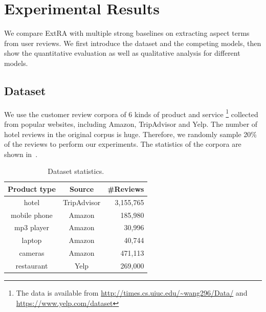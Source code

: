 \section{Experimental Results}
\label{sec:experiments}

We compare ExtRA with 
multiple strong baselines on extracting aspect terms from user reviews. 
We first introduce the dataset and the competing models, then
show the quantitative evaluation as well as qualitative analysis for
different models.

\subsection{Dataset}
\label{sec:dataset}
We use the customer review corpora of 6 kinds of product and service
\footnote{The data is available from
	\url{http://times.cs.uiuc.edu/~wang296/Data/} and 
	\url{https://www.yelp.com/dataset}} collected from popular websites, 
including Amazon, TripAdvisor and Yelp. 
The number of hotel reviews \cite{Wang2011LearningOD} in the original
corpus is huge. 
Therefore, we randomly sample 20\% of the reviews to perform our experiments.
The statistics of the corpora are shown in~.

\begin{table}[th!]
	\small
	\centering
	\vspace{-0.3cm}
	\caption{Dataset statistics.} 
	\label{table:dataset}
	\vspace{-0.2cm}
	\begin{tabular}{|c|c|r|}
		\hline
		\textbf{Product type} & \textbf{Source} & \textbf{\#Reviews} \\ \hline \hline
		hotel        & TripAdvisor & 3,155,765   \\\hline
		mobile phone & Amazon & 185,980  \\\hline
		mp3 player   & Amazon & 30,996   \\\hline
		laptop       & Amazon & 40,744   \\\hline
		cameras & Amazon & 471,113  \\\hline
		restaurant   & Yelp & 269,000   \\\hline
	\end{tabular}
	\vspace{-0.2cm}
\end{table}

